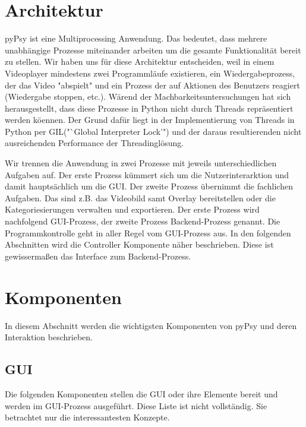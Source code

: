 \documentclass[a4paper,draft]{scrartcl}
\begin{document}
\section{Architektur}
pyPsy ist eine Multiprocessing Anwendung.
Das bedeutet, dass mehrere unabh\"angige Prozesse miteinander arbeiten um die gesamte Funktionalit\"at bereit zu stellen.
Wir haben uns f\"ur diese Architektur entscheiden, weil in einem Videoplayer mindestens zwei Programml\"aufe existieren, ein Wiedergabeprozess, der das Video "abspielt" und ein Prozess der auf Aktionen des Benutzers reagiert (Wiedergabe stoppen, etc.). W\"arend der Machbarkeitsuntersuchungen hat sich herausgestellt, dass diese Prozesse in Python nicht durch Threads repr\"asentiert werden k\"oennen.
Der Grund daf\"ur liegt in der Implementierung von Threads in Python per GIL("`Global Interpreter Lock'") und der daraus resultierenden nicht ausreichenden Performance der Threadingl\"osung.

Wir trennen die Anwendung in zwei Prozesse mit jeweils unterschiedlichen Aufgaben auf.
Der erste Prozess k\"ummert sich um die Nutzerinterarktion und damit haupts\"achlich um die GUI.
Der zweite Prozess \"ubernimmt die fachlichen Aufgaben. Das sind z.B. das Videobild samt Overlay bereitstellen oder die Kategoriesierungen verwalten und exportieren.
Der erste Prozess wird nachfolgend GUI-Prozess, der zweite Prozess Backend-Prozess genannt.
Die Programmkontrolle geht in aller Regel vom GUI-Prozess aus.
In den folgenden Abschnitten wird die Controller Komponente n\"aher beschrieben.
Diese ist gewisserma\ss en das Interface zum Backend-Prozess.

\section{Komponenten}
In diesem Abschnitt werden die wichtigsten Komponenten von pyPsy und deren Interaktion beschrieben.

\subsection{GUI}
Die folgenden Komponenten stellen die GUI oder ihre Elemente bereit und werden im GUI-Prozess ausgef\"uhrt.
Diese Liste ist nicht vollst\"andig.
Sie betrachtet nur die interessantesten Konzepte.
\end{document}
